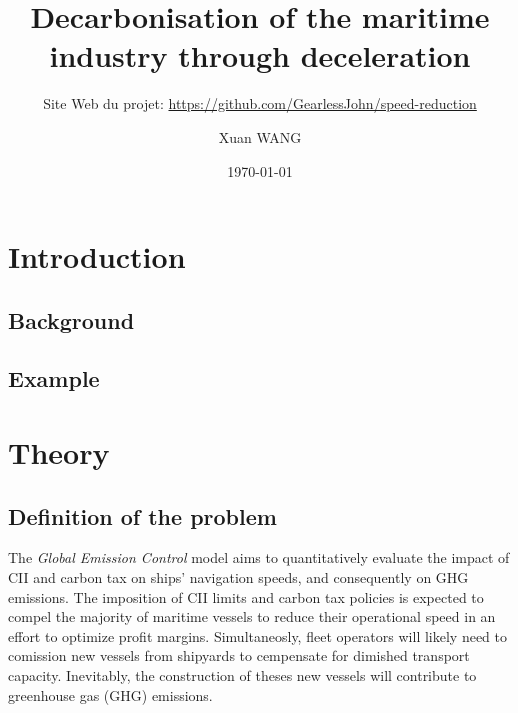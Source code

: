 \documentclass[a4paper,12pt]{article}
\author{Xuan WANG}
\date{\today}
\title{Decarbonisation of the maritime industry through deceleration}
\subtitle{Site Web du projet: \url{https://github.com/GearlessJohn/speed-reduction}}%
\begin{document}
\maketitle

\tableofcontents




\renewcommand{\thepage}{\arabic{page}}


\newpage
\setcounter{page}{1}
\section{Introduction}

\subsection{Background}

\subsection{Example}



\section{Theory}

\subsection{Definition of the problem}

The \textit{Global Emission Control} model aims to quantitatively evaluate the impact of CII and carbon tax on ships' navigation speeds, and consequently on GHG emissions. 
The imposition of CII limits and carbon tax policies is expected to compel the majority of maritime vessels to reduce their operational speed in an effort to optimize profit margins.
Simultaneosly, fleet operators will likely need to comission new vessels from shipyards to cempensate for dimished transport capacity. 
Inevitably, the construction of theses new vessels will contribute to greenhouse gas (GHG) emissions. \\ 
\end{document}
